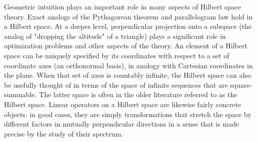 Geometric intuition plays an important role in many aspects of Hilbert space theory. Exact analogs of the Pythagorean theorem and parallelogram law hold in a Hilbert space. At a deeper level, perpendicular projection onto a subspace (the analog of "dropping the altitude" of a triangle) plays a significant role in optimization problems and other aspects of the theory. An element of a Hilbert space can be uniquely specified by its coordinates with respect to a set of coordinate axes (an orthonormal basis), in analogy with Cartesian coordinates in the plane. When that set of axes is countably infinite, the Hilbert space can also be usefully thought of in terms of the space of infinite sequences that are square-summable. The latter space is often in the older literature referred to as the Hilbert space. Linear operators on a Hilbert space are likewise fairly concrete objects: in good cases, they are simply transformations that stretch the space by different factors in mutually perpendicular directions in a sense that is made precise by the study of their spectrum.

